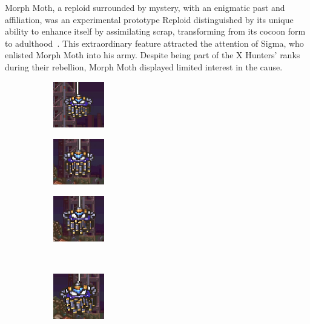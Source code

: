 Morph Moth, a reploid surrounded by mystery, with an enigmatic past and affiliation, was an experimental prototype Reploid distinguished by its unique ability to enhance itself by assimilating scrap, transforming from its cocoon form to adulthood~\cite{wiki:Morph_moth, wayback:X2_resources}. This extraordinary feature attracted the attention of Sigma, who enlisted Morph Moth into his army. Despite being part of the X Hunters' ranks during their rebellion, Morph Moth displayed limited interest in the cause.\begin{figure}[htp]
	\centering
	\begin{subfigure}{0.2\linewidth}
		\centering
		\includegraphics[height=2cm]{figures/X2/Morph_moth/Moth_1.jpg}
	\end{subfigure}
	\begin{subfigure}{0.2\linewidth}
		\centering
		\includegraphics[height=2cm]{figures/X2/Morph_moth/Moth_2.jpg}
	\end{subfigure}
	\begin{subfigure}{0.2\linewidth}
		\centering
		\includegraphics[height=2cm]{figures/X2/Morph_moth/Moth_3.jpg}
	\end{subfigure}\vspace{3pt}\\
	\begin{subfigure}{0.2\linewidth}	
		\centering
		\includegraphics[height=2cm]{figures/X2/Morph_moth/Moth_4.jpg}
	\end{subfigure}
	\begin{subfigure}{0.2\linewidth}
		\centering

\end{subfigure}
\end{figure}
